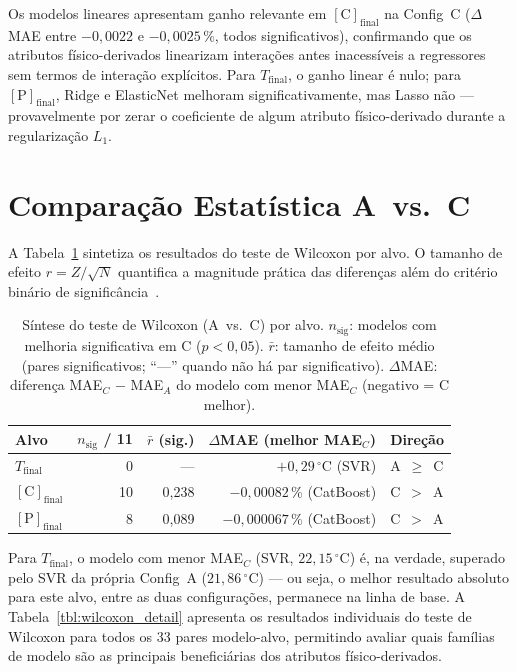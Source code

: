 Os modelos lineares apresentam ganho relevante em $[\text{C}]_\text{final}$ na Config~C ($\Delta$MAE entre $-0{,}0022$ e $-0{,}0025\,\%$, todos significativos), confirmando que os atributos físico-derivados linearizam interações antes inacessíveis a regressores sem termos de interação explícitos. Para $T_\text{final}$, o ganho linear é nulo; para $[\text{P}]_\text{final}$, Ridge e ElasticNet melhoram significativamente, mas Lasso não --- provavelmente por zerar o coeficiente de algum atributo físico-derivado durante a regularização $L_1$.


\section{Comparação Estatística A~vs.~C}
\label{sec:comparacao-ac}

A Tabela~\ref{tbl:wilcoxon_summary} sintetiza os resultados do teste de Wilcoxon por alvo. O tamanho de efeito $r = Z / \sqrt{N}$ quantifica a magnitude prática das diferenças além do critério binário de significância~\cite{field2009discovering}.

\begin{table}[H]
\caption{Síntese do teste de Wilcoxon (A~vs.~C) por alvo. $n_\text{sig}$: modelos com melhoria significativa em C ($p < 0{,}05$). $\bar{r}$: tamanho de efeito médio (pares significativos; ``---'' quando não há par significativo). $\Delta$MAE: diferença MAE$_C$ $-$ MAE$_A$ do modelo com menor MAE$_C$ (negativo = C melhor).}
\label{tbl:wilcoxon_summary}
\centering
\footnotesize
\setlength{\tabcolsep}{6pt}
\begin{tabular}{lrrrl}
\hline
\textbf{Alvo} & $n_\text{sig}$ / 11 & $\bar{r}$ (sig.) & $\Delta$MAE (melhor MAE$_C$) & Direção \\
\hline
$T_\text{final}$  & 0  & --- & $+0{,}29\,^\circ\text{C}$ (SVR) & A~$\geq$~C \\
$[\text{C}]_\text{final}$ & 10 & 0,238 & $-0{,}00082\,\%$ (CatBoost) & C~$>$~A \\
$[\text{P}]_\text{final}$ & 8  & 0,089 & $-0{,}000067\,\%$ (CatBoost) & C~$>$~A \\
\hline
\end{tabular}
\end{table}

Para $T_\text{final}$, o modelo com menor MAE$_C$ (SVR, $22{,}15\,^\circ\text{C}$) é, na verdade, superado pelo SVR da própria Config~A ($21{,}86\,^\circ\text{C}$) --- ou seja, o melhor resultado absoluto para este alvo, entre as duas configurações, permanece na linha de base. A Tabela~\ref{tbl:wilcoxon_detail} apresenta os resultados individuais do teste de Wilcoxon para todos os 33 pares modelo-alvo, permitindo avaliar quais famílias de modelo são as principais beneficiárias dos atributos físico-derivados.

